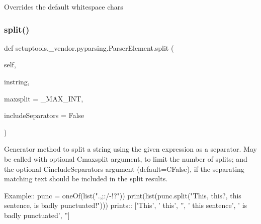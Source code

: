 \begin{DoxyVerb}Overrides the default whitespace chars
\end{DoxyVerb}
 \mbox{\label{classsetuptools_1_1__vendor_1_1pyparsing_1_1_parser_element_a261b8172db2d9632b1945ecd174bd3eb}} 
\subsubsection{\texorpdfstring{split()}{split()}}
{\footnotesize\ttfamily def setuptools.\+\_\+vendor.\+pyparsing.\+Parser\+Element.\+split (\begin{DoxyParamCaption}\item[{}]{self,  }\item[{}]{instring,  }\item[{}]{maxsplit = {\ttfamily \+\_\+MAX\+\_\+INT},  }\item[{}]{include\+Separators = {\ttfamily False} }\end{DoxyParamCaption})}

\begin{DoxyVerb}Generator method to split a string using the given expression as a separator.
May be called with optional C{maxsplit} argument, to limit the number of splits;
and the optional C{includeSeparators} argument (default=C{False}), if the separating
matching text should be included in the split results.

Example::        
    punc = oneOf(list(".,;:/-!?"))
    print(list(punc.split("This, this?, this sentence, is badly punctuated!")))
prints::
    ['This', ' this', '', ' this sentence', ' is badly punctuated', '']
\end{DoxyVerb}
 \mbox{\label{classsetuptools_1_1__vendor_1_1pyparsing_1_1_parser_element_ac6e7f89bdc7abe26d750b1e722508e52}} 
